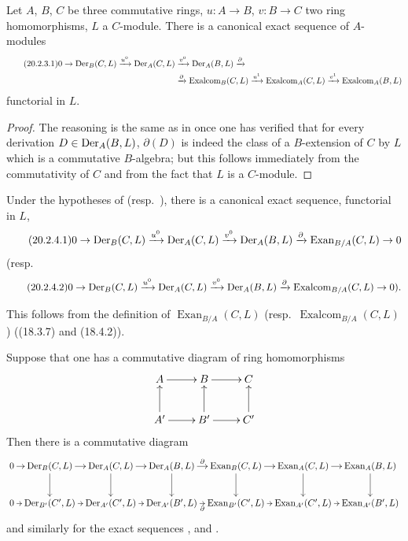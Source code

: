 \begin{corollary}[20.2.3]
\label{0.20.2.3}
Let $A$, $B$, $C$ be three commutative rings, $u:A\to B$, $v:B\to C$ two ring homomorphisms, $L$ a $C$-module.
There is a canonical exact sequence of $A$-modules
\begin{align}
\tag{20.2.3.1}
  \label{0.20.2.3.1}
  0\to\operatorname{Der}_B(C,L)\xrightarrow{u^0}\operatorname{Der}_A(C,L)&\xrightarrow{v^0}\operatorname{Der}_A(B,L)\xrightarrow{\partial} \\
  &\xrightarrow{\partial}\operatorname{Exalcom}_B(C,L)\xrightarrow{u^1}\operatorname{Exalcom}_A(C,L)\xrightarrow{v^1}\operatorname{Exalcom}_A(B,L) \notag
\end{align}
functorial in $L$.
\end{corollary}

\begin{proof}
The reasoning is the same as in  once one has verified that for every derivation $D\in\operatorname{Der}_A(B,L)$, $\partial(D)$ is indeed the class of a $B$-extension of $C$ by $L$ which is a commutative $B$-algebra; but this follows immediately from the commutativity of $C$ and from the fact that $L$ is a $C$-module.
\end{proof}

\begin{corollary}[20.2.4]
\label{0.20.2.4}
Under the hypotheses of  \textup{(resp.\ )}, there is a canonical exact sequence, functorial in $L$,
\begin{equation}
\tag{20.2.4.1}
  \label{0.20.2.4.1}
  0\to\operatorname{Der}_B(C,L)\xrightarrow{u^0}\operatorname{Der}_A(C,L)\xrightarrow{v^0}\operatorname{Der}_A(B,L)\xrightarrow{\partial}\operatorname{Exan}_{B/A}(C,L)\to 0
\end{equation}
\textup{(resp.}
\begin{equation}
\tag{20.2.4.2}
  \label{0.20.2.4.2}
  0\to\operatorname{Der}_B(C,L)\xrightarrow{u^0}\operatorname{Der}_A(C,L)\xrightarrow{v^0}\operatorname{Der}_A(B,L)\xrightarrow{\partial}\operatorname{Exalcom}_{B/A}(C,L)\to 0\text{).}
\end{equation}
\end{corollary}
\noindent This follows from the definition of $\operatorname{Exan}_{B/A}(C,L)$ (resp.\ $\operatorname{Exalcom}_{B/A}(C,L)$) ((18.3.7) and (18.4.2)).

\begin{remark}[20.2.5]
\label{0.20.2.5}
Suppose that one has a commutative diagram of ring homomorphisms
\[
\xymatrix{
  A \ar[r] & B \ar[r] & C \\
  A' \ar[u] \ar[r] & B' \ar[u] \ar[r] & C' \ar[u]
}
\]
Then there is a commutative diagram
\[
\xymatrix@C=0.5em{
  0 \ar[r] & \Der_B(C,L) \ar[r] \ar[d] & \Der_A(C,L) \ar[r] \ar[d] & \Der_A(B,L) \ar[r]^-\partial \ar[d] & \operatorname{Exan}_B(C,L) \ar[r] \ar[d] & \operatorname{Exan}_A(C,L) \ar[r] \ar[d] & \operatorname{Exan}_A(B,L) \ar[d] \\
  0 \ar[r] & \Der_{B'}(C',L) \ar[r] & \Der_{A'}(C',L) \ar[r] & \Der_{A'}(B',L) \ar[r]_-\partial & \operatorname{Exan}_{B'}(C',L) \ar[r] & \operatorname{Exan}_{A'}(C',L) \ar[r] & \operatorname{Exan}_{A'}(B',L)
}
\]
and similarly for the exact sequences ,  and .
\end{remark}

